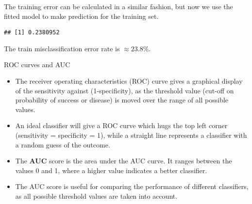 \documentclass[10pt,ignorenonframetext,]{beamer}
\newenvironment{Shaded}{\begin{snugshade}}{\end{snugshade}}
\newcommand{\KeywordTok}[1]{\textcolor[rgb]{0.13,0.29,0.53}{\textbf{#1}}}
\newcommand{\DecValTok}[1]{\textcolor[rgb]{0.00,0.00,0.81}{#1}}
\newcommand{\FloatTok}[1]{\textcolor[rgb]{0.00,0.00,0.81}{#1}}
\newcommand{\StringTok}[1]{\textcolor[rgb]{0.31,0.60,0.02}{#1}}
\newcommand{\OperatorTok}[1]{\textcolor[rgb]{0.81,0.36,0.00}{\textbf{#1}}}
\newcommand{\NormalTok}[1]{#1}
\begin{document}
\begin{frame}[fragile]

The training error can be calculated in a similar fashion, but now we
use the fitted model to make prediction for the training set.

\scriptsize

\begin{Shaded}
\end{Shaded}

\begin{verbatim}
## [1] 0.2380952
\end{verbatim}

\normalsize
The train misclassification error rate is \(\approx 23.8\%\).

\end{frame}

\begin{frame}

\begin{block}{ROC curves and AUC}

\vspace{2mm}

\begin{itemize}
\item
  The receiver operating characteristics (ROC) curve gives a graphical
  display of the sensitivity against (1-specificity), as the threshold
  value (cut-off on probability of success or disease) is moved over the
  range of all possible values.
\item
  An ideal classifier will give a ROC curve which hugs the top left
  corner (sensitivity = specificity = 1), while a straight line
  represents a classifier with a random guess of the outcome.
\item
  The \textbf{AUC} score is the area under the AUC curve. It ranges
  between the values 0 and 1, where a higher value indicates a better
  classifier.
\item
  The AUC score is useful for comparing the performance of different
  classifiers, as all possible threshold values are taken into account.
\end{itemize}

\end{block}

\end{frame}
\end{document}
